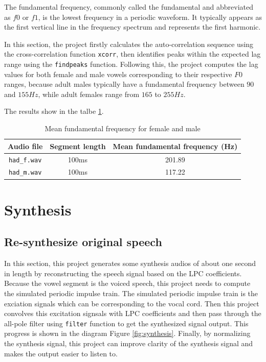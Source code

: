 \documentclass{article}
\begin{document}
The fundamental frequency, commonly called the fundamental and abbreviated as $f0$ or $f1$, is the lowest frequency in a periodic waveform. It typically appears as the first vertical line in the frequency spectrum and represents the first harmonic.

In this section, the project firstly calculates the auto-correlation sequence using the cross-correlation function \verb+xcorr+, then identifies peaks within the expected lag range using the \verb+findpeaks+ function. Following this, the project computes the lag values for both female and male vowels corresponding to their respective $F0$ ranges, because adult males typically have a fundamental frequency between $90$ and $155 Hz$, while adult females range from $165$ to $255 Hz$\citep{baken2000clinical}.

The results show in the talbe \ref{table:mean-fundamental-frequency}.

\begin{table}[ht]
\caption{Mean fundamental frequency for female and male} %
\centering %
\begin{tabular}{c c c} %
\hline\hline %
Audio file & Segment length & Mean fundamental frequency (Hz) \\ [0.5ex] %
\hline %
\verb+had_f.wav+ & 100ms & 201.89 \\ %
\verb+had_m.wav+ & 100ms & 117.22 \\ [1ex] %
\hline %
\end{tabular}
\label{table:mean-fundamental-frequency}
\end{table}

\section{Synthesis}

\subsection{Re-synthesize original speech}

In this section, this project generates some synthesis audios of about one second in length by reconstructing the speech signal based on the LPC coefficients. Because the vowel segment is the voiced speech, this project needs to compute the simulated periodic impulse train. The simulated periodic impulse train is the exciation signals which can be corresponding to the vocal cord. Then this project convolves this excitation signsals with LPC coefficients and then pass through the all-pole filter using \verb+filter+ function to get the synthesized signal output\citep{EEEM030}. This progress is shown in the diagram Figure \ref{fig:synthesis}. Finally, by normalizing the synthesis signal, this project can improve clarity of the synthesis signal and makes the output easier to listen to.
\end{document}
